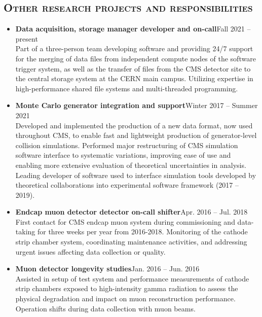 \documentclass[10pt]{res} %
\begin{document}
\begin{resume}
\section{\textsc{Other research projects and responsibilities}}
\begin{itemize}
  \item\textbf{Data acquisition, storage manager developer and on-call}\hfill{Fall 2021 -- present} \\
    Part of a three-person team developing software and providing 24/7 support for the merging
    of data files from independent compute nodes of the software trigger system,
    as well as the transfer of files from the CMS detector site to the central storage system
    at the CERN main campus. Utilizing expertise in high-performance shared file systems and multi-threaded
    programming.

  \item\textbf{Monte Carlo generator integration and support}\hfill{Winter 2017 -- Summer 2021} \\
    Developed and implemented the production of a new data format, now used throughout CMS, to enable fast and lightweight production
    of generator-level collision simulations. Performed major restructuring of CMS simulation software interface
    to systematic variations, improving ease of use and enabling more extensive evaluation of theoretical uncertainties in analysis.
    Leading developer of software used to interface simulation tools
    developed by theoretical collaborations into experimental software framework (2017 -- 2019).

  \item\textbf{Endcap muon detector detector on-call shifter}\hfill{Apr. 2016 -- Jul. 2018} \\
    First contact for CMS endcap muon system during commissioning and data-taking for three weeks per year
    from 2016-2018. Monitoring of the cathode strip chamber system, coordinating maintenance activities,
    and addressing urgent issues affecting data collection or quality.

  \item\textbf{Muon detector longevity studies}\hfill{Jan. 2016 -- Jun. 2016} \\
    Assisted in setup of test system and performance measurements of cathode strip chambers
    exposed to high-intensity gamma radiation to assess the physical degradation and impact on muon
    reconstruction performance. Operation shifts during data collection with muon beams.
\end{itemize}


\end{resume}
\end{document}
